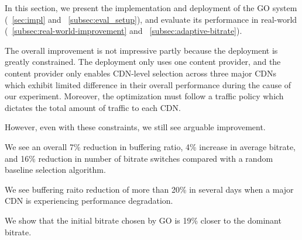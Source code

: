 \label{sec:eval}

In this section, we present the implementation and deployment of the GO system (\Section~\ref{sec:impl} and ~\ref{subsec:eval_setup}), and evaluate its performance in real-world (\Section~\ref{subsec:real-world-improvement} and ~\ref{subsec:adaptive-bitrate}). 

The overall improvement is not impressive partly because the deployment is greatly constrained. The deployment only uses one content provider, and the content provider only enables CDN-level selection across three major CDNs which exhibit limited difference in their overall performance during the cause of our experiment. Moreover, the optimization must follow a traffic policy which dictates the total amount of traffic to each CDN. 

However, even with these constraints, we still see arguable improvement. 

\begin{packedenumerate}
    \item We see an overall 7\% reduction in buffering ratio, 4\% increase in average bitrate, and 16\% reduction in number of bitrate switches compared with a random baseline selection algorithm.
    \item We see buffering raito reduction of more than 20\% in several days when a major CDN is experiencing performance degradation.
    \item We show that the initial bitrate chosen by GO is 19\% closer to the dominant bitrate.
\end{packedenumerate}




